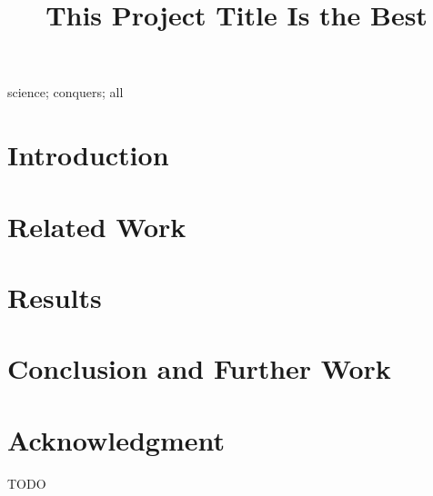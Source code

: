 \documentclass[10pt, conference, compsocconf]{IEEEtran}
\begin{document}
\title{This Project Title Is the Best}

\author{
}

\maketitle


\begin{abstract}
  
\end{abstract}

\begin{IEEEkeywords}
science; conquers; all
\end{IEEEkeywords}

\IEEEpeerreviewmaketitle

\section{Introduction}
\label{sec:intro}


\section{Related Work}
\label{sec:related}


\section{Results}
\label{sec:results}


\section{Conclusion and Further Work}
\label{sec:conclusion}


\section*{Acknowledgment}
\label{sec:acknowledgment}

TODO

\nocite{*}



\end{document}

